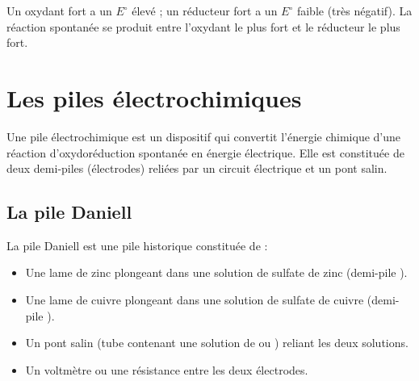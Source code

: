 \begin{aretenir}
Un oxydant fort a un $E^\circ$ élevé ; un réducteur fort a un $E^\circ$ faible (très négatif). La réaction spontanée se produit entre l'oxydant le plus fort et le réducteur le plus fort.
\end{aretenir}

\section{Les piles électrochimiques}

\begin{definition}
Une pile électrochimique est un dispositif qui convertit l'énergie chimique d'une réaction d'oxydoréduction spontanée en énergie électrique. Elle est constituée de deux demi-piles (électrodes) reliées par un circuit électrique et un pont salin.
\end{definition}

\subsection{La pile Daniell}

\begin{experience}
La pile Daniell est une pile historique constituée de :
\begin{itemize}
    \item Une lame de zinc plongeant dans une solution de sulfate de zinc  (demi-pile ).
    \item Une lame de cuivre plongeant dans une solution de sulfate de cuivre  (demi-pile ).
    \item Un pont salin (tube contenant une solution de  ou ) reliant les deux solutions.
    \item Un voltmètre ou une résistance entre les deux électrodes.
\end{itemize}
\end{experience}

